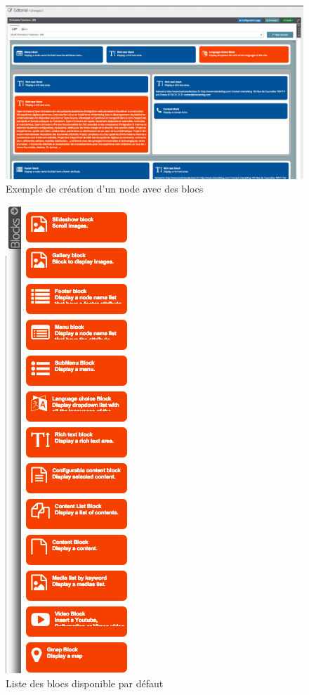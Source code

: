      \begin{figure}[H]
          \includegraphics[scale=0.4]{images/annexe_node}
 
        \caption{Exemple de création d'un node avec des blocs}
        \label{annexe_node}
      \end{figure}
     \begin{figure}[H]
        \begin{center}
          \includegraphics[scale=0.6]{images/annexe_bloc}
        \end{center}
        \caption{Liste des blocs disponible par défaut}
        \label{annexe_bloc}
      \end{figure}